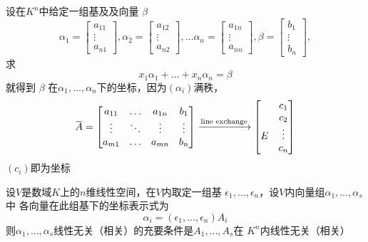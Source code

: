 \documentclass[11pt]{article}
\begin{document}
\begin{examplle}[]
\label{example4.1.15}
设在\(K^n\)中给定一组基及及向量 \(\beta\)
\begin{equation*}
\alpha_1=
\begin{bmatrix}
a_{11}\\\vdots\\a_{n1}
\end{bmatrix},
\alpha_2=
\begin{bmatrix}
a_{12}\\\vdots\\a_{n2}
\end{bmatrix},\dots
\alpha_n=
\begin{bmatrix}
a_{1n}\\\vdots\\a_{nn}
\end{bmatrix},
\beta=
\begin{bmatrix}
b_1\\\vdots\\b_n
\end{bmatrix},
\end{equation*}
求
\begin{equation*}
x_1\alpha_1+\dots+x_n\alpha_n=\beta
\end{equation*}
就得到 \(\beta\) 在\(\alpha_1,\dots,\alpha_n\)下的坐标，因为\((\alpha_i)\)满秩，
\begin{equation*}
\bbar{A}=
\begin{bmatrix}
a_{11}&\dots&a_{1n}&b_1\\
\vdots&\ddots&\vdots&\vdots\\
a_{m1}&\dots&a_{mn}&b_n\\
\end{bmatrix}\xrightarrow{\text{line exchange}}
\begin{bmatrix}
&c_1\\
&c_2\\
\Huge E&\vdots\\
&c_n
\end{bmatrix}
\end{equation*}
\((c_i)\)即为坐标
\end{examplle}

\begin{proposition}[]
\label{prop4.1.2}
设\(V\)是数域\(K\)上的\(n\)维线性空间，在\(V\)内取定一组基
\(\epsilon_1,\dots,\epsilon_n\)，设\(V\)内向量组\(\alpha_1,\dots,\alpha_s\)中
各向量在此组基下的坐标表示式为
\begin{equation*}
\alpha_i=(\epsilon_1,\dots,\epsilon_n)A_i
\end{equation*}
则\(\alpha_1,\dots,\alpha_s\)线性无关（相关）的充要条件是\(A_1,\dots,A_s\)在
\(K^n\)内线性无关（相关）
\end{proposition}
\end{document}
